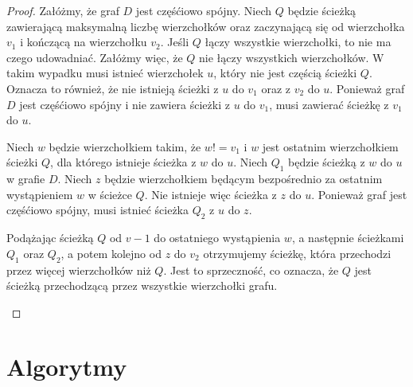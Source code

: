 \documentclass[a4paper,12pt]{mwart}
\begin{document}
\begin{proof}
  Załóżmy, że graf $D$ jest częśćiowo spójny. Niech $Q$ będzie ścieżką
  zawierającą maksymalną liczbę wierzchołków oraz zaczynającą się od
  wierzchołka $v_1$ i kończącą na wierzchołku $v_2$. Jeśli $Q$ łączy wszystkie
  wierzchołki, to nie ma czego udowadniać. Załóżmy więc, że $Q$ nie łączy
  wszystkich wierzchołków. W takim wypadku musi istnieć wierzchołek $u$, który
  nie jest częścią ścieżki $Q$. Oznacza to również, że nie istnieją ścieżki
  z $u$ do $v_1$ oraz z $v_2$ do $u$. Ponieważ graf $D$ jest częśćiowo spójny
  i nie zawiera ścieżki z $u$ do $v_1$, musi zawierać ścieżkę z $v_1$ do $u$.

  Niech $w$ będzie wierzchołkiem takim, że $w != v_1$ i $w$ jest ostatnim
  wierzchołkiem ścieżki $Q$, dla którego istnieje ścieżka z $w$ do $u$. Niech
  $Q_1$ będzie ścieżką z $w$ do $u$ w grafie $D$. Niech $z$ będzie wierzchołkiem
  będącym bezpośrednio za ostatnim wystąpieniem $w$ w ścieżce $Q$. Nie istnieje
  więc ścieżka z $z$ do $u$. Ponieważ graf jest częśćiowo spójny, musi istnieć
  ścieżka $Q_2$ z $u$ do $z$.

  Podążając ścieżką $Q$ od $v-1$ do ostatniego wystąpienia $w$, a następnie ścieżkami
  $Q_1$ oraz $Q_2$, a potem kolejno od $z$ do $v_2$ otrzymujemy ścieżkę, która
  przechodzi przez więcej wierzchołków niż $Q$. Jest to sprzeczność, co oznacza, że $Q$
  jest ścieżką przechodzącą przez wszystkie wierzchołki grafu.

\begin{figure}[H]
  \centering
\end{figure}

\end{proof}

\section{Algorytmy}
\end{document}
